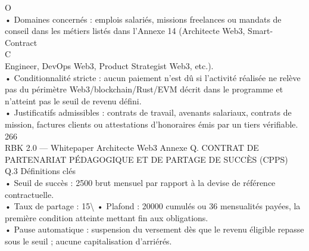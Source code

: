 O\\
\vspace{0.5em}
• Domaines concernés : emplois salariés, missions freelances ou mandats de conseil dans les métiers listés dans l’Annexe 14 (Architecte Web3, Smart-Contract\\
C\\
\vspace{0.5em}
\vspace{0.5em}
Engineer, DevOps Web3, Product Strategist Web3, etc.).\\
\vspace{0.5em}
• Conditionnalité stricte : aucun paiement n’est dû si l’activité réalisée ne relève pas du périmètre Web3/blockchain/Rust/EVM décrit dans le programme et\\
n’atteint pas le seuil de revenu défini.\\
\vspace{0.5em}
• Justificatifs admissibles : contrats de travail, avenants salariaux, contrats de mission, factures clients ou attestations d’honoraires émis par un tiers vérifiable.\\
\vspace{0.5em}
\vspace{0.5em}
\vspace{0.5em}
\vspace{0.5em}
266\\
RBK 2.0 — Whitepaper Architecte Web3                        Annexe Q. CONTRAT DE PARTENARIAT PÉDAGOGIQUE ET DE PARTAGE DE SUCCÈS (CPPS)\\
\vspace{0.5em}
\vspace{0.5em}
\vspace{0.5em}
Q.3 Définitions clés\\
• Seuil de succès : 2500 brut mensuel par rapport à la devise de référence contractuelle.\\
\vspace{0.5em}
• Taux de partage : 15\textbackslash{}%
\vspace{0.5em}
• Plafond : 20000 cumulés ou 36 mensualités payées, la première condition atteinte mettant fin aux obligations.\\
\vspace{0.5em}
• Pause automatique : suspension du versement dès que le revenu éligible repasse sous le seuil ; aucune capitalisation d’arriérés.\\
\vspace{0.5em}
